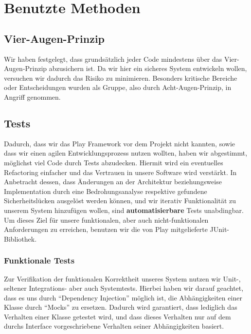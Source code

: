 \documentclass[12pt,DIV14,BCOR10mm,a4paper,parskip=half-,headsepline,headinclude,english,ngerman,bibliography=totocnumbered]{scrreprt}
\begin{document}
\vspace*{-3cm}

\tableofcontents  %

\chapter{Benutzte Methoden}
\section{Vier-Augen-Prinzip}

Wir haben festgelegt, dass grundsätzlich jeder Code mindestens über das Vier-Augen-Prinzip abzusichern ist.
Da wir hier ein sicheres System entwickeln wollen, versuchen wir dadurch das Risiko zu minimieren.
Besonders kritische Bereiche oder Entscheidungen wurden als Gruppe, also durch Acht-Augen-Prinzip, in Angriff genommen.

\section{Tests}

Dadurch, dass wir das Play Framework vor dem Projekt nicht kannten, sowie dass wir einen agilen Entwicklungsprozess nutzen wollten, haben wir abgestimmt, möglichst viel Code durch Tests abzudecken.
Hiermit wird ein eventuelles Refactoring einfacher und das Vertrauen in unsere Software wird verstärkt.
In Anbetracht dessen, dass Änderungen an der Architektur beziehungsweise Implementation durch eine Bedrohungsanalyse respektive gefundene Sicherheitslücken ausgelöst werden können, und wir iterativ Funktionalität zu unserem System hinzufügen wollen, sind \textbf{automatisierbare} Tests unabdingbar.
Um dieses Ziel für unsere funktionalen, aber auch nicht-funktionalen Anforderungen zu erreichen, benutzen wir die von Play mitgelieferte JUnit-Bibliothek.

\subsection{Funktionale Tests}

Zur Verifikation der funktionalen Korrektheit unseres System nutzen wir Unit-, seltener Integrations- aber auch Systemtests.
Hierbei haben wir darauf geachtet, dass es uns durch \enquote{Dependency Injection} möglich ist, die Abhängigkeiten einer Klasse durch \enquote{Mocks} zu ersetzen.
Dadurch wird garantiert, dass lediglich das Verhalten einer Klasse getestet wird, und dass dieses Verhalten nur auf dem durchs Interface vorgeschriebene Verhalten seiner Abhängigkeiten basiert.
\end{document}
